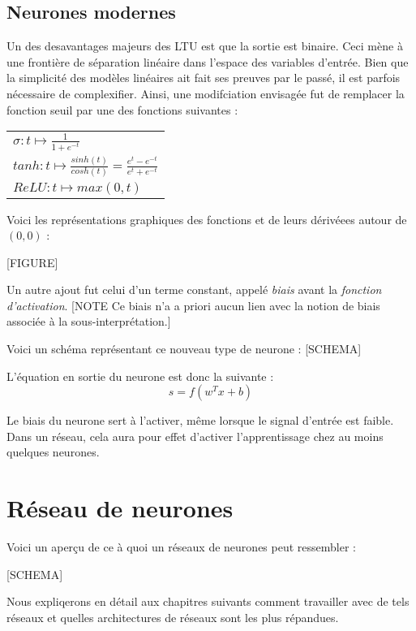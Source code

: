 \subsection{Neurones modernes}

Un des desavantages majeurs des LTU est que  la sortie est binaire. Ceci mène à une frontière de séparation linéaire dans l'espace des variables d'entrée. Bien que la simplicité des modèles linéaires ait fait ses preuves par le passé, il est parfois nécessaire de complexifier. Ainsi, une modifciation envisagée fut de remplacer la fonction seuil par une des fonctions suivantes : 

\begin{tabular}{l}
$\sigma : t \mapsto \frac{1}{1 + e^{-t}}$ \\
$tanh : t \mapsto \frac{sinh(t)}{cosh(t)} = \frac{e^t - e^{-t}}{e^t + e^{-t}}$ \\
$\mathit{ReLU} : t \mapsto max(0, t)$ \\
\end{tabular}

Voici les représentations graphiques des fonctions et de leurs dérivéees autour de $(0, 0)$ : 

[FIGURE]

Un autre ajout fut celui d'un terme constant, appelé \emph{biais} avant la \emph{fonction d'activation}. [NOTE Ce biais n'a a priori aucun lien avec la notion de biais associée à la sous-interprétation.]

Voici un schéma représentant ce nouveau type de neurone : [SCHEMA]

L'équation en sortie du neurone est donc la suivante : 
\begin{equation}
s = f(w^T x + b)
\end{equation}

Le biais du neurone sert à l'activer, même lorsque le signal d'entrée est faible. Dans un réseau, cela aura pour effet d'activer l'apprentissage chez au moins quelques neurones.

\section{Réseau de neurones}

 Voici un aperçu de ce à quoi un réseaux de neurones peut ressembler :

[SCHEMA]

Nous expliqerons en détail aux chapitres suivants comment travailler avec de tels réseaux et quelles architectures de réseaux sont les plus répandues.


